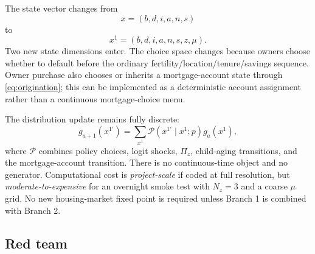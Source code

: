 \documentclass[11pt]{article}
\begin{document}
The state vector changes from
\begin{equation}
    x=(b,d,i,a,n,s)
\end{equation}
to
\begin{equation}
    x^1=(b,d,i,a,n,s,z,\mu).
\end{equation}
Two new state dimensions enter. The choice space changes because owners choose whether to default before the ordinary fertility/location/tenure/savings sequence. Owner purchase also chooses or inherits a mortgage-account state through \eqref{eq:origination}; this can be implemented as a deterministic account assignment rather than a continuous mortgage-choice menu.

The distribution update remains fully discrete:
\begin{equation}
    g_{a+1}(x^{1\prime})
    =
    \sum_{x^1}
    \mathcal P(x^{1\prime}\mid x^1;p)
    g_a(x^1),
    \label{eq:branch1-distribution}
\end{equation}
where $\mathcal P$ combines policy choices, logit shocks, $\Pi_z$, child-aging transitions, and the mortgage-account transition. There is no continuous-time object and no generator. Computational cost is \emph{project-scale} if coded at full resolution, but \emph{moderate-to-expensive} for an overnight smoke test with $N_z=3$ and a coarse $\mu$ grid. No new housing-market fixed point is required unless Branch 1 is combined with Branch 2.

\subsection{Red team}
\end{document}
